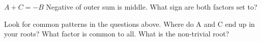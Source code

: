 \documentclass[12pt, a4paper, addpoints]{exam}
\begin{document}
\begin{questions}
\newpage


\question   $A+C=-B$  Negative of outer sum is middle. What sign are both factors set to?
\setlength{\columnsep}{20pt}
\begin{multicols}{2}
\end{multicols}
\question  Look for common patterns in the questions above. Where do A and C end up in your roots? What factor is common to all. What is the non-trivial root?


\end{questions}
\end{document}
